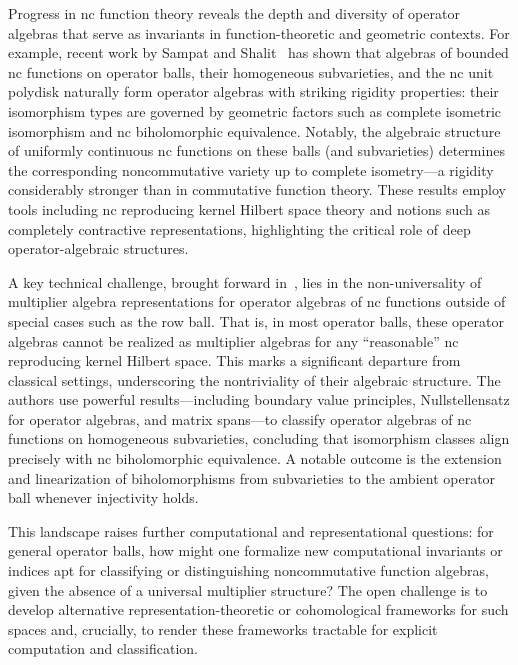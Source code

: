 \documentclass[sigconf]{acmart}
\begin{document}
Progress in nc function theory reveals the depth and diversity of operator algebras that serve as invariants in function-theoretic and geometric contexts. For example, recent work by Sampat and Shalit~\cite{ref98} has shown that algebras of bounded nc functions on operator balls, their homogeneous subvarieties, and the nc unit polydisk naturally form operator algebras with striking rigidity properties: their isomorphism types are governed by geometric factors such as complete isometric isomorphism and nc biholomorphic equivalence. Notably, the algebraic structure of uniformly continuous nc functions on these balls (and subvarieties) determines the corresponding noncommutative variety up to complete isometry---a rigidity considerably stronger than in commutative function theory. These results employ tools including nc reproducing kernel Hilbert space theory and notions such as completely contractive representations, highlighting the critical role of deep operator-algebraic structures.

A key technical challenge, brought forward in~\cite{ref98}, lies in the non-universality of multiplier algebra representations for operator algebras of nc functions outside of special cases such as the row ball. That is, in most operator balls, these operator algebras cannot be realized as multiplier algebras for any “reasonable” nc reproducing kernel Hilbert space. This marks a significant departure from classical settings, underscoring the nontriviality of their algebraic structure. The authors use powerful results---including boundary value principles, Nullstellensatz for operator algebras, and matrix spans---to classify operator algebras of nc functions on homogeneous subvarieties, concluding that isomorphism classes align precisely with nc biholomorphic equivalence. A notable outcome is the extension and linearization of biholomorphisms from subvarieties to the ambient operator ball whenever injectivity holds.

This landscape raises further computational and representational questions: for general operator balls, how might one formalize new computational invariants or indices apt for classifying or distinguishing noncommutative function algebras, given the absence of a universal multiplier structure? The open challenge is to develop alternative representation-theoretic or cohomological frameworks for such spaces and, crucially, to render these frameworks tractable for explicit computation and classification.
\end{document}
